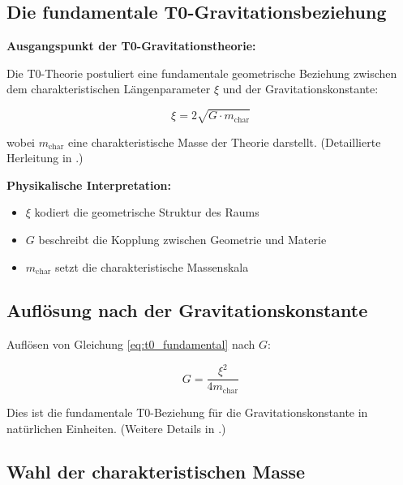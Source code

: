 	\subsection{Die fundamentale T0-Gravitationsbeziehung}
	
	\begin{derivation}
		\textbf{Ausgangspunkt der T0-Gravitationstheorie:}
		
		Die T0-Theorie postuliert eine fundamentale geometrische Beziehung zwischen dem charakteristischen Längenparameter $\xi$ und der Gravitationskonstante:
		
		\begin{equation}
			\xi = 2\sqrt{G \cdot m_{\text{char}}}
			\label{eq:t0_fundamental}
		\end{equation}
		
		wobei $m_{\text{char}}$ eine charakteristische Masse der Theorie darstellt. (Detaillierte Herleitung in \cite{T0_Gravitationskonstante_De}.)
		
		\textbf{Physikalische Interpretation:}
		\begin{itemize}
			\item $\xi$ kodiert die geometrische Struktur des Raums
			\item $G$ beschreibt die Kopplung zwischen Geometrie und Materie
			\item $m_{\text{char}}$ setzt die charakteristische Massenskala
		\end{itemize}
	\end{derivation}
	
	\subsection{Auflösung nach der Gravitationskonstante}
	
	Auflösen von Gleichung \eqref{eq:t0_fundamental} nach $G$:
	
	\begin{equation}
		\boxed{G = \frac{\xi^2}{4 m_{\text{char}}}}
		\label{eq:g_fundamental}
	\end{equation}
	
	Dies ist die fundamentale T0-Beziehung für die Gravitationskonstante in natürlichen Einheiten. (Weitere Details in \cite{gravitationskonstante_De}.)
	
	\subsection{Wahl der charakteristischen Masse}
	
